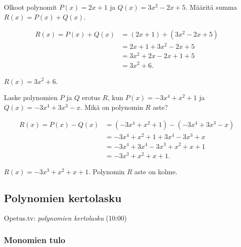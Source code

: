 \begin{esimerkki}
    Olkoot polynomit $P(x)=2x+1$ ja $Q(x)=3x^2-2x+5$. Määritä summa $R(x)=P(x)+Q(x)$.
    \begin{esimratk}
        \begin{align*}
            R(x) = P(x)+Q(x) &= (2x+1)+(3x^2-2x+5) \\
                             &= 2x+1+3x^2-2x+5 \\
                             &= 3x^2+2x-2x+1+5 \\
                             &= 3x^2+6.
        \end{align*}
    \end{esimratk}
    \begin{esimvast}
        $R(x) = 3x^2+6$.
    \end{esimvast}
\end{esimerkki}

\begin{esimerkki}
    Laske polynomien $P$ ja $Q$ erotus $R$, kun $P(x)=-3x^4+x^2+1$ ja $Q(x)=-3x^4+3x^3-x$.
    Mikä on polynomin $R$ aste?
   \begin{esimratk}
        \begin{align*}
            R(x) = P(x)-Q(x) &= (-3x^4+x^2+1)-(-3x^4+3x^3-x) \\
                             &= -3x^4+x^2+1+3x^4-3x^3+x \\
                             &= -3x^4+3x^4-3x^3+x^2+x+1 \\
                             &= -3x^3+x^2+x+1.
        \end{align*}
    \end{esimratk}
    \begin{esimvast}
        $R(x) = -3x^3+x^2+x+1$. Polynomin $R$ aste on kolme.
    \end{esimvast}
\end{esimerkki}

\subsection*{Polynomien kertolasku}

{Opetus.tv: \emph{polynomien kertolasku} (10:00)}

\subsubsection*{Monomien tulo}


